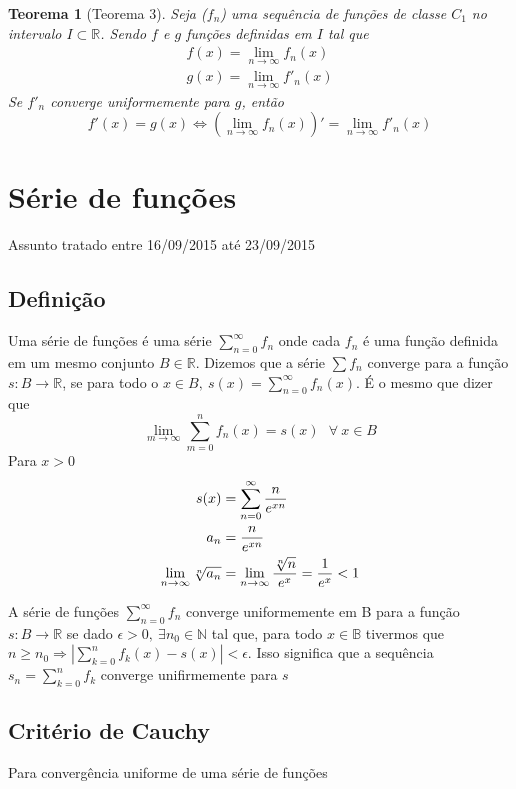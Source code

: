 \documentclass[12pt,openany, letterpaper]{book}
\newtheorem{theorem}{Teorema}[section]
\newcommand{\LI}[1][n]{\lim_{{#1} \rightarrow \infty}}
\newcommand{\soma}[2][n]{\sum_{{#1} = #2}^\infty}
\begin{document}
\begin{theorem}[Teorema 3\label{t:3-3}] 
Seja ($f_n$) uma sequência de funções de classe $C_1$ no intervalo $I \subset \mathds{R}$. Sendo $f$ e $g$ funções definidas em $I$ tal  que \begin{align*}
f(x) = \LI f_n (x) \\
g(x) = \LI f'_n(x)
\end{align*}
Se $f'_n$ converge uniformemente para $g$, então $$f'(x) = g(x) \Longleftrightarrow \left( \LI f_n(x)\right)' = \LI f'_n(x)$$
\end{theorem}

\chapter{Série de funções} {Assunto tratado entre 16/09/2015 até 23/09/2015}
\label{chap:c4}
\section{Definição}
\hspace{5mm} Uma série de funções é uma série $\displaystyle{\soma{0} f_n}$ onde cada $f_n$ é uma função definida em um mesmo conjunto $B \in \mathds{R}$. Dizemos que a série $\sum f_n$ converge para a função $s: B \rightarrow \mathds{R}$, se para todo o $x \in B, \ s(x) = \soma{0} f_n(x)$. É o mesmo que dizer que $$\LI[m] \sum_{m=0}^n f_n(x) = s(x) \ \ \  \forall \ x \in B$$
 Para $x > 0$\begin{align*}
 s(x) &= \soma{0} \frac{n}{e^{xn}}\\
 a_n &= {n \over e^{xn}}\\
 \LI \sqrt[n]{a_n} &= \LI {\sqrt[n]{n} \over e^x} = {1 \over e^x} <1
 \end{align*}

A série de funções $\displaystyle{\soma{0} f_n}$ converge uniformemente em B para a função $s: B \rightarrow \mathds{R}$ se dado $\epsilon > 0, \ \exists n_0 \in \mathds{N}$ tal que, para todo $x \in \mathds{B}$ tivermos que $n\geq n_0 \Rightarrow \displaystyle{\left|\sum_{k = 0}^n f_k (x) - s(x)\right| < \epsilon}$. Isso significa que a sequência $s_n = \displaystyle{\sum_{k=0}^n f_k}$ converge unifirmemente para $s$

\section{Critério de Cauchy} {Para convergência uniforme de uma série de funções}
\end{document}
